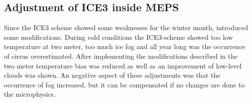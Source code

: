 
%



%
\subsection{Adjustment of ICE3 inside MEPS}
Since the ICE3 scheme showed some weaknesses for the winter month, \cite{muller_arome-metcoop:_2017} introduced some modifications. 
During cold conditions the ICE3-scheme showed too low temperature at two meter, too much ice fog and all year long was the occurrence of cirrus overestimated. After implementing the modifications described in \cite{muller_arome-metcoop:_2017} the two meter temperature bias was reduced as well as an improvement of low-level clouds was shown. An negative aspect of these adjustments was that the occurrence of fog increased, but it can be compensated if no changes are done to the microphysics. 



